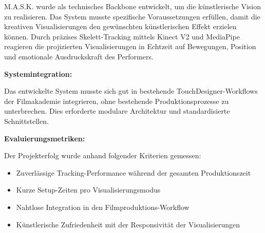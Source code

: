 M.A.S.K. wurde als technisches Backbone entwickelt, um die künstlerische Vision zu realisieren. Das System musste spezifische Voraussetzungen erfüllen, damit die kreativen Visualisierungen den gewünschten künstlerischen Effekt erzielen können. Durch präzises Skelett-Tracking mittels Kinect V2 und MediaPipe reagieren die projizierten Visualisierungen in Echtzeit auf Bewegungen, Position und emotionale Ausdruckskraft des Performers.

\textbf{Systemintegration:}

\raggedright Das entwickelte System musste sich gut in bestehende TouchDesigner-Workflows der Filmakademie integrieren, ohne bestehende Produktionsprozesse zu unterbrechen. Dies erforderte modulare Architektur und standardisierte Schnittstellen.

\textbf{Evaluierungsmetriken:}

Der Projekterfolg wurde anhand folgender Kriterien gemessen:
\begin{itemize}
    \item Zuverlässige Tracking-Performance während der gesamten Produktionszeit
    \item Kurze Setup-Zeiten pro Visualisierungsmodus
    \item Nahtlose Integration in den Filmproduktions-Workflow
    \item Künstlerische Zufriedenheit mit der Responsivität der Visualisierungen
\end{itemize}